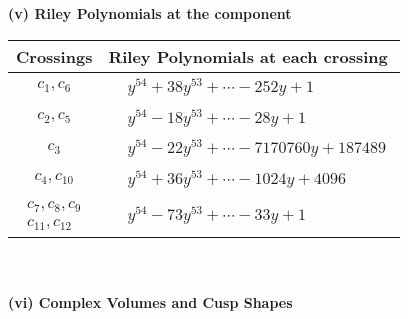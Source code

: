 \documentclass[1p]{elsarticle_modified}
\theoremstyle{definition}
\begin{document}
\newpage\renewcommand{\arraystretch}{1}
\flushleft \textbf{(v) Riley Polynomials at the component}\newline \\
\begin{tabular}{m{50pt}|m{274pt}}
Crossings & \hspace{64pt}Riley Polynomials at each crossing \\
\hline $$\begin{aligned}c_{1},c_{6}\end{aligned}$$&$\begin{aligned}
&y^{54}+38 y^{53}+\cdots-252 y+1
\end{aligned}$\\
\hline $$\begin{aligned}c_{2},c_{5}\end{aligned}$$&$\begin{aligned}
&y^{54}-18 y^{53}+\cdots-28 y+1
\end{aligned}$\\
\hline $$\begin{aligned}c_{3}\end{aligned}$$&$\begin{aligned}
&y^{54}-22 y^{53}+\cdots-7170760 y+187489
\end{aligned}$\\
\hline $$\begin{aligned}c_{4},c_{10}\end{aligned}$$&$\begin{aligned}
&y^{54}+36 y^{53}+\cdots-1024 y+4096
\end{aligned}$\\
\hline $$\begin{aligned}c_{7},c_{8},c_{9}\\c_{11},c_{12}\end{aligned}$$&$\begin{aligned}
&y^{54}-73 y^{53}+\cdots-33 y+1
\end{aligned}$\\
\hline
\end{tabular}\\~\\
\newpage\flushleft \textbf{(vi) Complex Volumes and Cusp Shapes}
\end{document}
